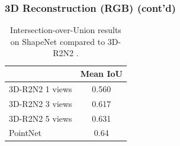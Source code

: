 \documentclass[14pt]{beamer}
\begin{document}
  \begin{frame}
    \frametitle{3D Reconstruction (RGB) (cont'd)}
    \begin{table}
      \begin{tabular}{l | c}
        & Mean IoU\\\hline
        3D-R2N2 \cite{Choy:2016} 1 views & 0.560\\
        3D-R2N2 \cite{Choy:2016} 3 views & 0.617\\
        3D-R2N2 \cite{Choy:2016} 5 views & 0.631\\
        PointNet & 0.64
      \end{tabular}
      \caption{Intersection-over-Union results on ShapeNet \cite{Chang:2015} compared to 3D-R2N2 \cite{Choy:2016}.}
    \end{table}
  \end{frame}
  
\end{document}
